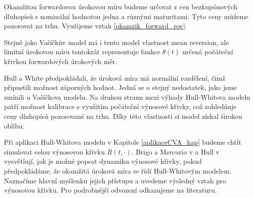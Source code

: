 \documentclass[a4paper,12pt]{report}
\theoremstyle{definition} \newtheorem{definice}[veta]{Definice}
\theoremstyle{remark}
\begin{document}
Okamžitou forwardovou úrokovou míru budeme určovat z cen bezkupónových dluhopisů s nominální hodnotou jedna a různými maturitami. 
Tyto ceny můžeme pozorovat na trhu.
Využijeme vztah
\eqref{okamzik_forward_rov}.

Stejně jako Vašíčkův model má i tento model vlastnost mean reversion, ale limitní úrokovou míru tentokrát reprezentuje funkce $\theta(t)$ určená počáteční křivkou forwardových úrokových měr.%

Hull a White předpokládali, že úroková míra má normální rozdělení, čímž připustili možnost záporných hodnot.
Jedná se o stejný nedostatek, jako jsme zmínili u Vašíčkova modelu.
Na druhou stranu mezi výhody Hull-Whitova modelu patří možnost kalibrace s využitím počáteční výnosové křivky, což zohledňuje ceny dluhopisů pozorované na trhu.
Díky této vlastnosti si model získal širokou oblibu.

Při aplikaci Hull-Whitova modelu v Kapitole \ref{aplikaceCVA_kap} budeme chtít simulovat celou výnosovou křivku $R(t,\cdot)$.
Brigo a Mercurio v \cite{brigo2007interest} a Hull v \cite{hull} vysvětlují, jak je možné popsat dynamiku výnosové křivky, pokud předpokládáme, že okamžitá úroková míra se řídí Hull-Whitovým modelem.
Naznačíme hlavní myšlenku jejich přístupu a uvedeme výsledný vztah pro výnosovou křivku.
Pro podrobnější odvození odkazujeme na literaturu. 
\end{document}
